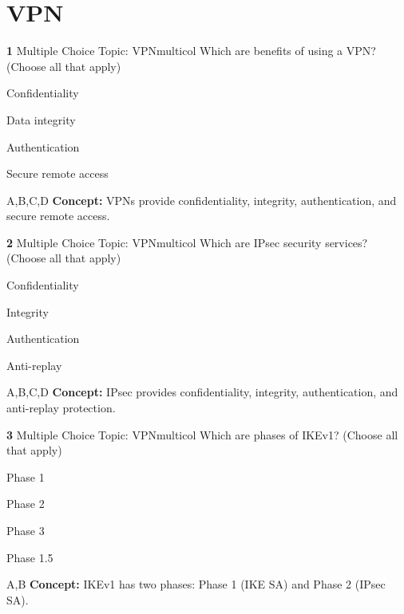 \documentclass[10pt,a4paper]{article}
\begin{document}
\section{VPN}
\begin{qcard}{\color{white}\textbf{1} \hfill \small Multiple Choice \textbar{} Topic: VPN}{multicol}
Which are benefits of using a VPN? (Choose all that apply)

\begin{qoptions}
\item Confidentiality
\item Data integrity
\item Authentication
\item Secure remote access
\end{qoptions}
\begin{explainbox}{A,B,C,D}
\textbf{Concept:} VPNs provide confidentiality, integrity, authentication, and secure remote access.
\end{explainbox}
\end{qcard}

\begin{qcard}{\color{white}\textbf{2} \hfill \small Multiple Choice \textbar{} Topic: VPN}{multicol}
Which are IPsec security services? (Choose all that apply)

\begin{qoptions}
\item Confidentiality
\item Integrity
\item Authentication
\item Anti-replay
\end{qoptions}
\begin{explainbox}{A,B,C,D}
\textbf{Concept:} IPsec provides confidentiality, integrity, authentication, and anti-replay protection.
\end{explainbox}
\end{qcard}

\begin{qcard}{\color{white}\textbf{3} \hfill \small Multiple Choice \textbar{} Topic: VPN}{multicol}
Which are phases of IKEv1? (Choose all that apply)

\begin{qoptions}
\item Phase 1
\item Phase 2
\item Phase 3
\item Phase 1.5
\end{qoptions}
\begin{explainbox}{A,B}
\textbf{Concept:} IKEv1 has two phases: Phase 1 (IKE SA) and Phase 2 (IPsec SA).
\end{explainbox}
\end{qcard}
\end{document}
